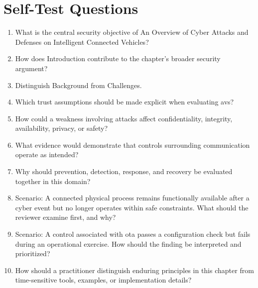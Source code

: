 \documentclass[11pt]{article}
\begin{document}
\section*{Self-Test Questions}
\begin{enumerate}
\item What is the central security objective of An Overview of Cyber Attacks and Defenses on Intelligent Connected Vehicles?
\item How does Introduction contribute to the chapter's broader security argument?
\item Distinguish Background from Challenges.
\item Which trust assumptions should be made explicit when evaluating avs?
\item How could a weakness involving attacks affect confidentiality, integrity, availability, privacy, or safety?
\item What evidence would demonstrate that controls surrounding communication operate as intended?
\item Why should prevention, detection, response, and recovery be evaluated together in this domain?
\item Scenario: A connected physical process remains functionally available after a cyber event but no longer operates within safe constraints. What should the reviewer examine first, and why?
\item Scenario: A control associated with ota passes a configuration check but fails during an operational exercise. How should the finding be interpreted and prioritized?
\item How should a practitioner distinguish enduring principles in this chapter from time-sensitive tools, examples, or implementation details?
\end{enumerate}
\end{document}
